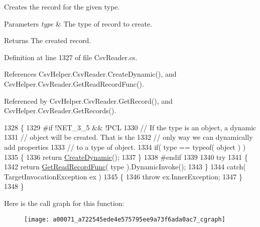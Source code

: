 Creates the record for the given type. 


\begin{DoxyParams}{Parameters}
{\em type} & The type of record to create.\\
\hline
\end{DoxyParams}
\begin{DoxyReturn}{Returns}
The created record.
\end{DoxyReturn}


Definition at line 1327 of file Csv\-Reader.\-cs.



References Csv\-Helper.\-Csv\-Reader.\-Create\-Dynamic(), and Csv\-Helper.\-Csv\-Reader.\-Get\-Read\-Record\-Func().



Referenced by Csv\-Helper.\-Csv\-Reader.\-Get\-Record(), and Csv\-Helper.\-Csv\-Reader.\-Get\-Records().


\begin{DoxyCode}
1328         \{
1329 \textcolor{preprocessor}{#if !NET\_3\_5 && !PCL
}
1330 \textcolor{preprocessor}{}            \textcolor{comment}{// If the type is an object, a dynamic}
1331             \textcolor{comment}{// object will be created. That is the}
1332             \textcolor{comment}{// only way we can dynamically add properties}
1333             \textcolor{comment}{// to a type of object.}
1334             \textcolor{keywordflow}{if}( type == typeof( \textcolor{keywordtype}{object} ) )
1335             \{
1336                 \textcolor{keywordflow}{return} \hyperlink{a00071_a4b6150b5ff8a85d9cf05aa1027554a50}{CreateDynamic}();
1337             \}
1338 \textcolor{preprocessor}{#endif
}
1339 \textcolor{preprocessor}{}
1340             \textcolor{keywordflow}{try}
1341             \{
1342                 \textcolor{keywordflow}{return} \hyperlink{a00071_a80a053f470462225c390208e27a1132a}{GetReadRecordFunc}( type ).DynamicInvoke();
1343             \}
1344             \textcolor{keywordflow}{catch}( TargetInvocationException ex )
1345             \{
1346                 \textcolor{keywordflow}{throw} ex.InnerException;
1347             \}
1348         \}
\end{DoxyCode}


Here is the call graph for this function\-:
\nopagebreak
\begin{figure}[H]
\begin{center}
\leavevmode
\texttt{[image: a00071\_a722545ede4e575795ee9a73f6ada0ac7\_cgraph]}
\end{center}
\end{figure}




